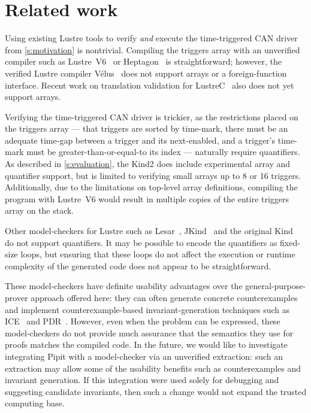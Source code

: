 
\section{Related work}
\label{s:related-work}


Using existing Lustre tools to verify \emph{and} execute the time-triggered CAN driver from \autoref{s:motivation} is nontrivial.
Compiling the triggers array with an unverified compiler such as Lustre~V6~\cite{jahier2016lustre} or Heptagon~\cite{gerard2012modular} is straightforward; however, the verified Lustre compiler Vélus~\cite{bourke2023verified} does not support arrays or a foreign-function interface.
Recent work on translation validation for LustreC~\cite{brun2023equation} also does not yet support arrays.

Verifying the time-triggered CAN driver is trickier, as the restrictions placed on the triggers array --- that triggers are sorted by time-mark, there must be an adequate time-gap between a trigger and its next-enabled, and a trigger's time-mark must be greater-than-or-equal-to its index --- naturally require quantifiers.
As described in \autoref{s:evaluation}, the Kind2 does include experimental array and quantifier support, but is limited to verifying small arrays up to 8 or 16 triggers.
Additionally, due to the limitations on top-level array definitions, compiling the program with Lustre~V6 would result in multiple copies of the entire triggers array on the stack.

Other model-checkers for Lustre such as Lesar~\cite{raymond2008synchronous}, JKind~\cite{gacek2018jkind} and the original Kind~\cite{hagen2008scaling} do not support quantifiers.
It may be possible to encode the quantifiers as fixed-size loops, but ensuring that these loops do not affect the execution or runtime complexity of the generated code does not appear to be straightforward.

These model-checkers have definite usability advantages over the general-purpose-prover approach offered here: they can often generate concrete counterexamples and implement counterexample-based invariant-generation techniques such as ICE~\cite{garg2014ice} and PDR~\cite{bradley2011sat,een2011efficient}.
However, even when the problem can be expressed, these model-checkers do not provide much assurance that the semantics they use for proofs matches the compiled code.
In the future, we would like to investigate integrating Pipit with a model-checker via an unverified extraction: such an extraction may allow some of the usability benefits such as counterexamples and invariant generation.
If this integration were used solely for debugging and suggesting candidate invariants, then such a change would not expand the trusted computing base.

